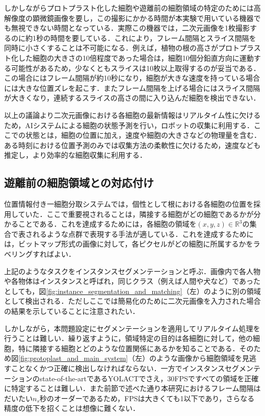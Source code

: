     しかしながらプロトプラスト化した細胞や遊離前の細胞領域の特定のためには高解像度の顕微鏡画像を要し，この撮影にかかる時間が本実験で用いている機器でも無視できない時間となっている．実際この機器では，二次元画像を1枚撮影するのに約1秒の時間を要している．これにより，フレーム間隔とスライス間隔を同時に小さくすることは不可能になる．例えば，植物の根の高さがプロトプラスト化した細胞の大きさの10倍程度であった場合は，細胞10個分鉛直方向に運動する可能性があるため，少なくともスライスは10枚以上取得するのが妥当である．この場合にはフレーム間隔が約10秒になり，細胞が大きな速度を持っている場合には大きな位置ズレを起こす．またフレーム間隔を上げる場合にはスライス間隔が大きくなり，連続するスライスの高さの間に入り込んだ細胞を検出できない．

    以上の議論より二次元画像における各細胞の最新情報はリアルタイム性に欠けるため，AIシステムによる細胞の状態予測を行い，ロボットの収集に利用する．ここでの状態とは，細胞の位置に加え，速度や細胞の大きさなどの物理量を含む．ある時刻における位置予測のみでは収集方法の柔軟性に欠けるため，速度なども推定し，より効率的な細胞収集に利用する．

    \subsection{遊離前の細胞領域との対応付け}

    位置情報付き一細胞分取システムでは，個性として根における各細胞の位置を採用していた．ここで重要視されることは，隣接する細胞がどの細胞であるかが分かることである．これを達成するためには，各細胞の領域を${(x, y, z)} \in \mathbb{R}^3$の集合で表されるような点群で表現する手法が適している．これを達成するためには，ビットマップ形式の画像に対して，各ピクセルがどの細胞に所属するかをラベリングすればよい．

    上記のようなタスクをインスタンスセグメンテーション\cite{hafiz2020survey}と呼ぶ．画像内で各人物や各物体はインスタンスと呼ばれ，同じクラス（例えば人間や犬など）であったとしても，図\ref{fig:instance_segmentation_and_matching}（左）のように別の領域として検出される．ただしここでは簡易化のために二次元画像を入力された場合の結果を示していることに注意されたい．

    しかしながら，本問題設定にセグメンテーションを適用してリアルタイム処理を行うことは難しい．繰り返すように，領域特定の目的は各細胞に対して，他の細胞，特に隣接する細胞とどのような位置関係にあるかを知ることである．そのため図\ref{fig:protoplast_and_main_system}（左）のような画像から細胞領域を見逃すことなくかつ正確に検出しなければならない．一方でインスタンスセグメンテーションのstate-of-the-artであるYOLACT\cite{Bolya_2019_ICCV}でさえ，30FPSですべての領域を正確に特定することは難しい．また前節で述べた通り本研究におけるフレーム間隔はだいたい$n_s$秒のオーダーであるため，FPSは大きくても1以下であり，さらなる精度の低下を招くことは想像に難くない．

